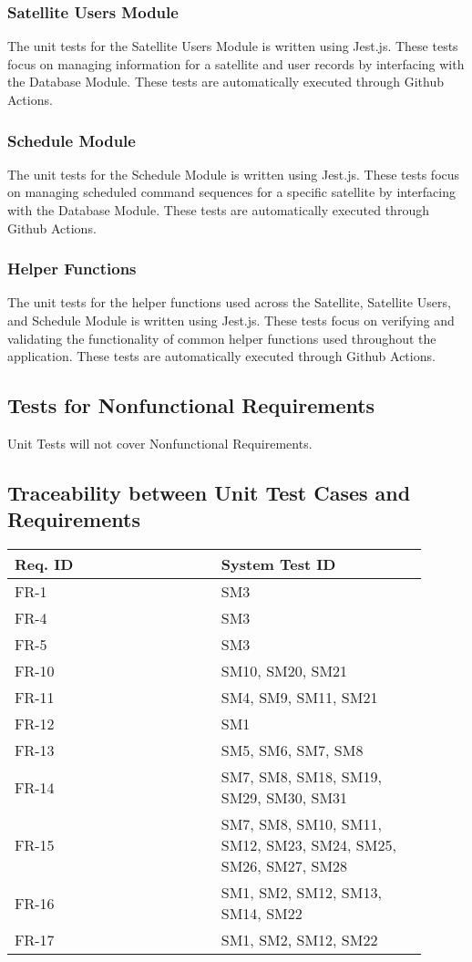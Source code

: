 \documentclass[12pt, titlepage]{article}
\begin{document}
\subsubsection{Satellite Users Module}
The unit tests for the Satellite Users Module is written using Jest.js. These tests focus on managing information for a satellite and user records by interfacing with the Database Module. These tests are automatically executed through Github Actions.

\subsubsection{Schedule Module}
The unit tests for the Schedule Module is written using Jest.js. These tests focus on managing scheduled command sequences for a specific satellite by interfacing with the Database Module. These tests are automatically executed through Github Actions.

\subsubsection{Helper Functions}
The unit tests for the helper functions used across the Satellite, Satellite Users, and Schedule Module is written using Jest.js. These tests focus on verifying and validating the functionality of common helper functions used throughout the application. These tests are automatically executed through Github Actions.

\subsection{Tests for Nonfunctional Requirements}
Unit Tests will not cover Nonfunctional Requirements.

\subsection{Traceability between Unit Test Cases and Requirements}
\begin{longtable}{|p{0.45\linewidth}|p{0.45\linewidth}|}
\hline
\textbf{Req. ID} & \textbf{System Test ID} \\
\hline
FR-1 & SM3 \\
\hline
FR-4 & SM3 \\
\hline
FR-5 & SM3 \\
\hline
FR-10 & SM10, SM20, SM21 \\
\hline
FR-11 & SM4, SM9, SM11, SM21 \\
\hline
FR-12 & SM1 \\
\hline
FR-13 & SM5, SM6, SM7, SM8 \\
\hline
FR-14 & SM7, SM8, SM18, SM19, SM29, SM30, SM31 \\
\hline
FR-15 & SM7, SM8, SM10, SM11, SM12, SM23, SM24, SM25, SM26, SM27, SM28 \\
\hline
FR-16 & SM1, SM2, SM12, SM13, SM14, SM22 \\
\hline
FR-17 & SM1, SM2, SM12, SM22 \\
\hline
\end{longtable}

\end{document}
